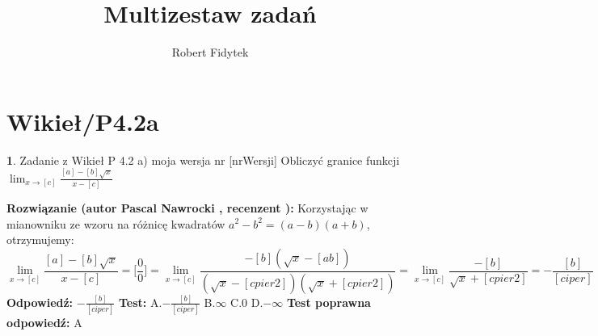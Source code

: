 \documentclass[12pt, a4paper]{article}
\title{Multizestaw zadań}
\author{Robert Fidytek}
\date{}
\theoremstyle{definition} %
\newtheorem{zad}{}
\newcommand{\kategoria}[1]{\section{#1}} %
\newcommand{\zadStart}[1]{\begin{zad}#1\newline} %
\newcommand{\zadStop}{\end{zad}}   %
\newcommand{\rozwStart}[2]{\noindent \textbf{Rozwiązanie (autor #1 , recenzent #2): }\newline} %
\newcommand{\rozwStop}{\newline}                                            %
\newcommand{\odpStart}{\noindent \textbf{Odpowiedź:}\newline}    %
\newcommand{\odpStop}{\newline}                                             %
\newcommand{\testStart}{\noindent \textbf{Test:}\newline} %
\newcommand{\testStop}{\newline} %
\newcommand{\kluczStart}{\noindent \textbf{Test poprawna odpowiedź:}\newline} %
\newcommand{\kluczStop}{\newline} %
\begin{document}
\maketitle


\kategoria{Wikieł/P4.2a}
\zadStart{Zadanie z Wikieł P 4.2 a) moja wersja nr [nrWersji]}
Obliczyć granice funkcji $\displaystyle{\lim_{x \to [c]}} \frac{[a]-[b]\sqrt{x}}{x-[c]}$
\zadStop
\rozwStart{Pascal Nawrocki}{}
Korzystając w mianowniku ze wzoru na różnicę kwadratów $a^2-b^2=(a-b)(a+b)$, otrzymujemy:
$$\displaystyle{\lim_{x \to [c]}} \frac{[a]-[b]\sqrt{x}}{x-[c]}=\big[\frac{0}{0}\big]=\displaystyle{\lim_{x \to [c]}} \frac{-[b](\sqrt{x}-[ab])}{(\sqrt{x}-[cpier2])(\sqrt{x}+[cpier2])}=\displaystyle{\lim_{x \to [c]}} \frac{-[b]}{\sqrt{x}+[cpier2]}=-\frac{[b]}{[ciper]}$$
\rozwStop
\odpStart
$-\frac{[b]}{[ciper]}$
\odpStop
\testStart
A.$-\frac{[b]}{[ciper]}$
B.$\infty$
C.$0$
D.$-\infty$
\testStop
\kluczStart
A
\kluczStop
\end{document}
